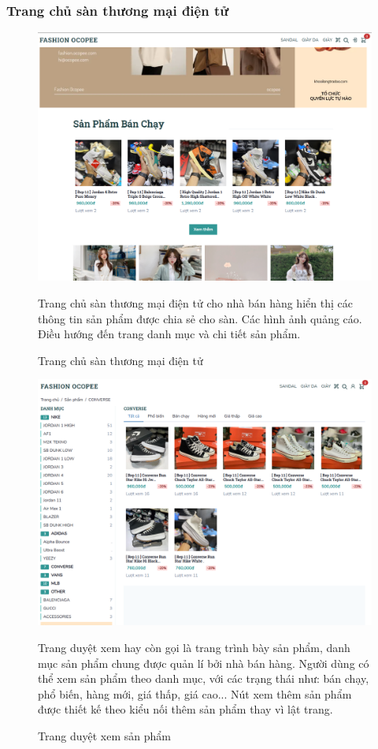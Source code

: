 \subsubsection{Trang chủ sàn thương mại điện tử}
\FloatBarrier
\begin{figure}[!htbp]\fontsize{13px}{13px}\selectfont
\centering
		\includegraphics[width=\textwidth]{./results/homepage}
		\caption{Trang chủ sàn thương mại điện tử}
\justifying
Trang chủ sàn thương mại điện tử cho nhà bán hàng hiển thị các thông tin sản phẩm được chia sẻ cho sàn. Các hình ảnh quảng cáo. Điều hướng đến trang danh mục và chi tiết sản phẩm.
\end{figure}
\clearpage
\FloatBarrier
\begin{figure}[!htbp]\fontsize{13px}{13px}\selectfont
\centering
		\includegraphics[width=\textwidth]{./results/categories-page}
		\caption{Trang duyệt xem sản phẩm}
\justifying
Trang duyệt xem hay còn gọi là trang trình bày sản phẩm, danh mục sản phẩm chung được quản lí bởi nhà bán hàng. Người dùng có thể xem sản phẩm theo danh mục, với các trạng thái như: bán chạy, phổ biến, hàng mới, giá thấp, giá cao... Nút xem thêm sản phẩm được thiết kế theo kiểu nối thêm sản phẩm thay vì lật trang.

\end{figure}
